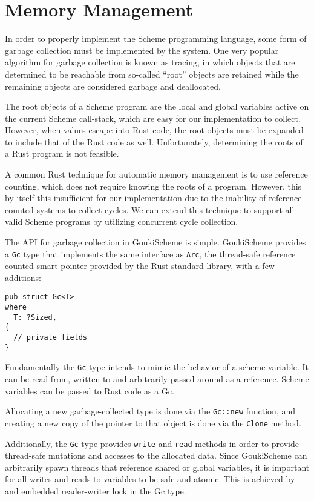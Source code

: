 \documentclass[sigplan,review,anonymous]{acmart}
\begin{document}
\section{Memory Management}

In order to properly implement the Scheme programming language, some form of
garbage collection must be implemented by the system. One very popular algorithm
for garbage collection is known as tracing, in which objects that are determined
to be reachable from so-called ``root'' objects are retained while the remaining
objects are considered garbage and deallocated\cite{lisptracing}.

The root objects of a Scheme program are the local and global variables active on
the current Scheme call-stack, which are easy for our implementation to collect.
However, when values escape into Rust code, the root objects must be expanded to
include that of the Rust code as well. Unfortunately, determining the roots of a
Rust program is not feasible\cite{rusttracing}.

A common Rust technique for automatic memory management is to use reference
counting, which does not require knowing the roots of a program. However, this
by itself this insufficient for our implementation due to the inability of
reference counted systems to collect cycles\cite{rc}. We can extend this
technique to support all valid Scheme programs by utilizing concurrent cycle
collection\cite{cc}.

The API for garbage collection in GoukiScheme is simple. GoukiScheme provides a
\texttt{Gc} type that implements the same interface as \texttt{Arc}\cite{arc},
the thread-safe reference counted smart pointer provided by the Rust standard
library, with a few additions:

\begin{verbatim}
pub struct Gc<T>
where
  T: ?Sized,
{
  // private fields
}
\end{verbatim}

Fundamentally the \texttt{Gc} type intends to mimic the behavior of a scheme variable.
It can be read from,  written to and arbitrarily passed around as a reference. Scheme
variables can be passed to Rust code as a Gc. 

Allocating a new garbage-collected type is done via the \texttt{Gc::new} function, and
creating a new copy of the pointer to that object is done via the \texttt{Clone}
method.

Additionally, the \texttt{Gc} type provides \texttt{write} and \texttt{read}
methods in order to provide thread-safe mutations and accesses to the allocated
data. Since GoukiScheme can arbitrarily spawn threads that reference shared or
global variables, it is important for all writes and reads to variables to be safe
and atomic. This is achieved by and embedded reader-writer lock in the Gc type.
\end{document}
